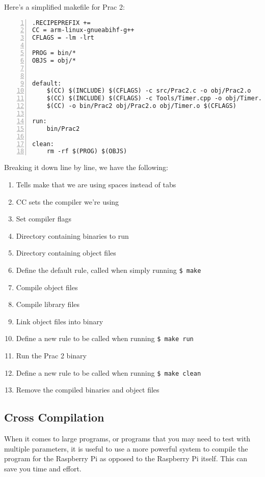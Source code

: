 Here's a simplified makefile for Prac 2:
\begin{lstlisting}[numbers=left, stepnumber=1]
.RECIPEPREFIX +=
CC = arm-linux-gnueabihf-g++
CFLAGS = -lm -lrt

PROG = bin/*
OBJS = obj/*


default:
    $(CC) $(INCLUDE) $(CFLAGS) -c src/Prac2.c -o obj/Prac2.o
    $(CC) $(INCLUDE) $(CFLAGS) -c Tools/Timer.cpp -o obj/Timer.o
    $(CC) -o bin/Prac2 obj/Prac2.o obj/Timer.o $(CFLAGS)

run:
    bin/Prac2

clean: 
    rm -rf $(PROG) $(OBJS) 
\end{lstlisting}
Breaking it down line by line, we have the following:
\begin{enumerate}
    \item Tells make that we are using spaces instead of tabs
    \item CC sets the compiler we're using
    \item Set compiler flags
    \setcounter{enumi}{4}
    \item Directory containing binaries to run
    \item Directory containing object files
    \setcounter{enumi}{8}
    \item Define the default rule, called when simply running \verb|$ make|
    \item Compile object files
    \item Compile library files
    \item Link object files into binary
    \setcounter{enumi}{13}
    \item Define a new rule to be called when running \verb|$ make run|
    \item Run the Prac 2 binary
    \setcounter{enumi}{16}
    \item Define a new rule to be called when running \verb|$ make clean|
    \item Remove the compiled binaries and object files
\end{enumerate}

\subsection{Cross Compilation}
\label{sec:crosscompile}
When it comes to large programs, or programs that you may need to test with multiple parameters, it is useful to use a more powerful system to compile the program for the Raspberry Pi as opposed to the Raspberry Pi itself. This can save you time and effort.

